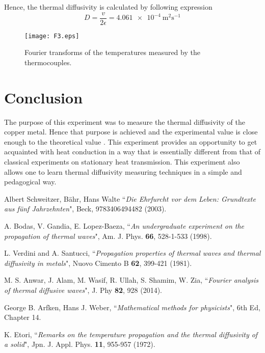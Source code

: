 \documentclass[12pt,a4]{article}
\begin{document}
Hence, the thermal diffusivity is calculated by following expression
\begin{equation}
D=\frac{v}{2\epsilon}= \SI{4.061e-4} {\meter^2\second^{-1}} 
\end{equation}


\begin{figure}[!ht]
\begin{center}
\texttt{[image: F3.eps]}\\
\caption{Fourier transforms of the temperatures measured by the thermocouples. } \label{fig4}
\end{center}
\end{figure}

\section{Conclusion}

 

The purpose of this experiment was to measure the thermal diffusivity of the copper metal. Hence that purpose is achieved and the experimental value is close enough to the theoretical value \cite{4}. This experiment provides an opportunity to get acquainted with heat conduction in a way that is essentially different from that of classical experiments on stationary heat transmission. This experiment also allows one to learn thermal diffusivity measuring techniques in a simple and pedagogical way.

\begin{thebibliography}{99}

 
 

 Albert Schweitzer, Bähr, Hans Walte ``\emph{Die Ehrfurcht vor dem Leben: Grundtexte aus fünf Jahrzehnten}", Beck, 9783406494482 (2003).

 A. Bodas, V. Gandia, E. Lopez-Baeza, ``\emph{An undergraduate experiment on the propagation of thermal waves}", Am. J. Phys. \textbf{66}, 528-1-533 (1998).

 L. Verdini and A. Santucci, ``\emph{Propagation properties of thermal waves and
thermal diffusivity in metals}", Nuovo Cimento B \textbf{62}, 399-421 (1981).


 M. S. Anwar, J. Alam, M. Wasif, R. Ullah, S. Shamim, W. Zia, ``\emph{Fourier analysis of thermal diffusive waves}", J. Phy \textbf{82}, 928 (2014).

 George B. Arfken, Hans J. Weber, ``\emph{Mathematical methods for physicists}", 6th Ed, Chapter 14.

 K. Etori, ``\emph{Remarks on the temperature propagation and the thermal diffusivity of a solid}", Jpn. J. Appl. Phys. \textbf{11}, 955-957 (1972).


\end{thebibliography}

\end{document}
